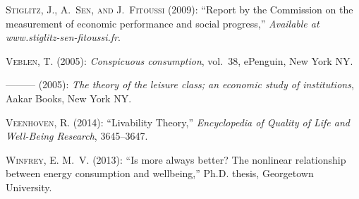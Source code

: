 \documentclass[10pt, letterpaper]{article}
\begin{document}
\begin{spacing}{1.0}
\begin{thebibliography}{49}
\textsc{Stiglitz, J., A.~Sen, and J.~Fitoussi} (2009): \enquote{Report by the
  Commission on the measurement of economic performance and social progress,}
  \emph{Available at www.stiglitz-sen-fitoussi.fr}.

\textsc{Veblen, T.} (2005{}): \emph{Conspicuous consumption},
  vol.~38, ePenguin, New York NY.

---\hspace{-.1pt}---\hspace{-.1pt}--- (2005{}): \emph{The theory of
  the leisure class; an economic study of institutions}, Aakar Books, New York
  NY.

\textsc{Veenhoven, R.} (2014): \enquote{Livability Theory,} \emph{Encyclopedia
  of Quality of Life and Well-Being Research}, 3645--3647.

\textsc{Winfrey, E. M.~V.} (2013): \enquote{Is more always better? The
  nonlinear relationship between energy consumption and wellbeing,} Ph.D.
  thesis, Georgetown University.

\end{thebibliography}









\end{spacing}
\end{document}
